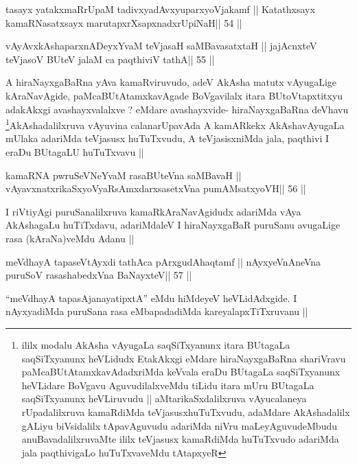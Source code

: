 \begin{shl}
tasayx yatakxmaRrUpaM tadivxyadAvxyuparxyoVjakamf ||
Katathxsayx kamaRNasatxsayx marutapxrXsapxnadxrUpiNaH\hfill || 54 ||
\end{shl}

\begin{shl}
vAyAvxkAshaparxnADeyxYvaM teVjasaH saMBavasatxtaH ||
jajAcnxteV teVjasoV BUteV jalaM ca paqthiviV tathA\hfill || 55 ||
\end{shl}

\begin{artha}
A hiraNayxgaBaRna yAva kamaRviruvudo, adeV AkAsha matutx vAyugaLige
kAraNavAgide, paMcaBUtAtamxkavAgade BoVgavilalx itara BUtoVtapxtitxyu
adakAkxgi avashayxvalalxve ? eMdare avashayxvide- hiraNayxgaBaRna
deVhavu \footnote{ililx modalu AkAsha vAyugaLa saqSiTxyanunx itara
BUtagaLa saqSiTxyanunx heVLidudx EtakAkxgi eMdare hiraNayxgaBaRna
shariVravu paMcaBUtAtamxkavAdadxriMda keVvala eraDu BUtagaLa
saqSiTxyanunx heVLidare BoVgavu AguvudilalxveMdu tiLidu itara mUru
BUtagaLa saqSiTxyanunx heVLiruvudu || aMtarikaSxdalilxruva
vAyucalaneya rUpadalilxruva kamaRdiMda teVjasusxhuTuTxvudu, adaMdare
AkAshadalilx gALiyu biVsidalilx tApavAguvudu adariMda niVru
maLeyAguvudeMbudu anuBavadalilxruvaMte ililx teVjasusx kamaRdiMda
huTuTxvudo adariMda jala paqthivigaLo huTuTxvaveMdu tAtapxyeR}AkAshadalilxruva vAyuvina calanarUpavAda A
kamARkekx AkAshavAyugaLa mUlaka adariMda teVjasusx huTuTxvudu, A
teVjasisxniMda jala, paqthivi I eraDu BUtagaLU huTuTxvavu ||
\end{artha}

\begin{shl}
kamaRNA pwruSeVNeYvaM rasaBUteVna saMBavaH ||
vAyavxnatxrikaSxyoVyaRsAmxdarxsasetxVna pumAMsatxyoVH\hfill || 56 ||
\end{shl}

\begin{artha}
I riVtiyAgi puruSanalilxruva kamaRkAraNavAgidudx adariMda vAya
AkAshagaLu huTiTxdavu, adariMdaleV I hiraNayxgaBaR puruSanu avugaLige
rasa (kAraNa)veMdu Adanu ||
\end{artha}

\begin{shl}
meVdhayA tapaseVtAyxdi tathAca pArxgudAhaqtamf ||
nAyxyeVnAneVna puruSoV rasashabedxVna BaNayxteV\hfill || 57 ||
\end{shl}

\begin{artha}
``meVdhayA tapasA\s janayatipxtA'' eMdu hiMdeyeV heVLidAdxgide. I
nAyxyadiMda puruSana rasa eMbapadadiMda kareyalapxTiTxruvanu ||
\end{artha}

